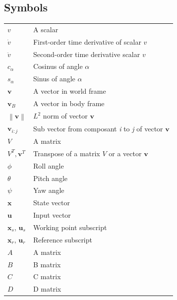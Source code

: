 \documentclass[a4paper, 12pt]{report}
\newcommand\norm[1]{\left\lVert#1\right\rVert}
\begin{document}
\subsection*{Symbols}
\begin{table}[htbp]
\centering
\begin{tabular}{p{8cm} p{8cm}}
$v$ \dotfill & A scalar \\
$\dot v$ \dotfill & First-order time derivative of scalar $v$ \\
$ \ddot v$ \dotfill & Second-order time derivative scalar $v$\\
$c_{\alpha}$ \dotfill & Cosinus of angle $\alpha$ \\
$s_{\alpha}$ \dotfill & Sinus of angle $\alpha$ \\
$\boldsymbol{v}$ \dotfill & A vector in world frame \\
$\boldsymbol{v}_B$ \dotfill & A vector in body frame \\
$\norm{\boldsymbol{v}}$ \dotfill & $L^2$ norm of vector $\boldsymbol{v}$ \\
$\boldsymbol{v}_{i:j}$ \dotfill & Sub vector from composant \emph{i} to \emph{j} of vector $\boldsymbol{v}$\\
$V$ \dotfill & A matrix \\
$V^T,\boldsymbol{v}^T$ \dotfill & Transpose of a matrix $V$ or a vector $\boldsymbol{v}$ \\
$\phi$ \dotfill & Roll angle \\
$\theta$ \dotfill & Pitch angle \\
$\psi$ \dotfill & Yaw angle \\
$\boldsymbol{x}$ \dotfill & State vector \\
$\boldsymbol{u}$ \dotfill & Input vector \\
$\boldsymbol{x}_s$, $\boldsymbol{u}_s$ \dotfill & Working point subscript \\
$\boldsymbol{x}_r$, $\boldsymbol{u}_r$ \dotfill & Reference subscript \\
$A$ \dotfill & A matrix \\
$B$ \dotfill & B matrix \\
$C$ \dotfill & C matrix \\
$D$ \dotfill & D matrix \\
\end{tabular}
\end{table}
\end{document}
